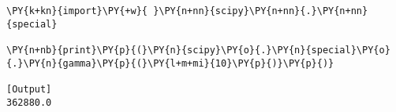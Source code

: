 \begin{Verbatim}[label=\makebox{\href{https://github.com/unipi-physics-labs/statnotes/tree/main/snippy/scipy.special.gamma.py}{https://github.com/.../scipy.special.gamma.py}},commandchars=\\\{\}]
\PY{k+kn}{import}\PY{+w}{ }\PY{n+nn}{scipy}\PY{n+nn}{.}\PY{n+nn}{special}

\PY{n+nb}{print}\PY{p}{(}\PY{n}{scipy}\PY{o}{.}\PY{n}{special}\PY{o}{.}\PY{n}{gamma}\PY{p}{(}\PY{l+m+mi}{10}\PY{p}{)}\PY{p}{)}

[Output]
362880.0
\end{Verbatim}
